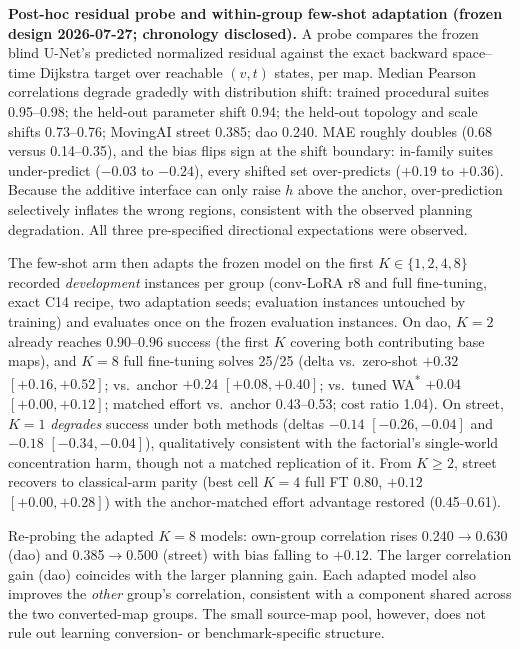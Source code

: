 \documentclass[letterpaper]{article} %
\begin{document}
\textbf{Post-hoc residual probe and within-group few-shot adaptation (frozen design 2026-07-27; chronology disclosed).} A probe compares the frozen blind U-Net's predicted normalized residual against the exact backward space--time Dijkstra target over reachable $(v,t)$ states, per map. Median Pearson correlations degrade gradedly with distribution shift: trained procedural suites 0.95--0.98; the held-out parameter shift 0.94; the held-out topology and scale shifts 0.73--0.76; MovingAI street 0.385; dao 0.240. MAE roughly doubles (0.68 versus 0.14--0.35), and the bias flips sign at the shift boundary: in-family suites under-predict ($-0.03$ to $-0.24$), every shifted set over-predicts ($+0.19$ to $+0.36$). Because the additive interface can only raise $h$ above the anchor, over-prediction selectively inflates the wrong regions, consistent with the observed planning degradation. All three pre-specified directional expectations were observed.

The few-shot arm then adapts the frozen model on the first $K \in \{1,2,4,8\}$ recorded \emph{development} instances per group (conv-LoRA r8 and full fine-tuning, exact C14 recipe, two adaptation seeds; evaluation instances untouched by training) and evaluates once on the frozen evaluation instances. On dao, $K{=}2$ already reaches 0.90--0.96 success (the first $K$ covering both contributing base maps), and $K{=}8$ full fine-tuning solves 25/25 (delta vs.\ zero-shot $+0.32$ $[+0.16,+0.52]$; vs.\ anchor $+0.24$ $[+0.08,+0.40]$; vs.\ tuned WA\textsuperscript{*} $+0.04$ $[+0.00,+0.12]$; matched effort vs.\ anchor 0.43--0.53; cost ratio 1.04). On street, $K{=}1$ \emph{degrades} success under both methods (deltas $-0.14$ $[-0.26,-0.04]$ and $-0.18$ $[-0.34,-0.04]$), qualitatively consistent with the factorial's single-world concentration harm, though not a matched replication of it. From $K \geq 2$, street recovers to classical-arm parity (best cell $K{=}4$ full FT 0.80, $+0.12$ $[+0.00,+0.28]$) with the anchor-matched effort advantage restored (0.45--0.61).

Re-probing the adapted $K{=}8$ models: own-group correlation rises 0.240$\to$0.630 (dao) and 0.385$\to$0.500 (street) with bias falling to $+0.12$. The larger correlation gain (dao) coincides with the larger planning gain. Each adapted model also improves the \emph{other} group's correlation, consistent with a component shared across the two converted-map groups. The small source-map pool, however, does not rule out learning conversion- or benchmark-specific structure.
\end{document}
